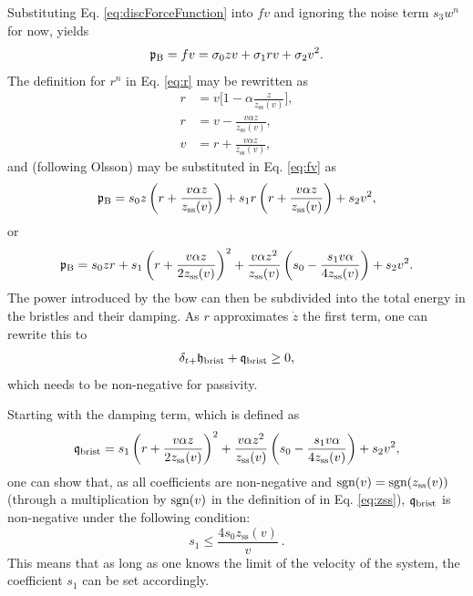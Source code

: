 Substituting Eq. \eqref{eq:discForceFunction} into $fv$ and ignoring the noise term $s_3w^n$ for now, yields
\begin{equation}\label{eq:fv}
    \mathfrak{p}_{\text{B}} = fv = \sigma_{0}zv +\sigma_{1}rv+\sigma_{2}v^2.
\end{equation}
The definition for $r^n$ in Eq. \eqref{eq:r} may be rewritten as
\begin{equation*}
    \begin{aligned}
        r &= v\bigg[1-\alpha\frac{z}{z_\text{ss}(v)}\bigg],\\
        r &= v-\frac{v\alpha z}{z_\text{ss}(v)},\\
        v &= r + \frac{v\alpha z}{z_\text{ss}(v)},
    \end{aligned}
\end{equation*}
and (following Olsson) may be substituted in Eq. \eqref{eq:fv} as
\begin{equation}
    \mathfrak{p}_{\text{B}} = s_{0}z\left(r+ \frac{v\alpha z}{z_\text{ss}(v)}\right)+s_{1}r\left(r+ \frac{v\alpha z}{z_\text{ss}(v)}\right)+s_{2}v^2,
\end{equation}
or
\begin{equation}
    \mathfrak{p}_{\text{B}} = s_0zr+s_1\left(r+\frac{v\alpha z}{2z_\text{ss}(v)}\right)^2+\frac{v\alpha z^2}{z_\text{ss}(v)}\left(s_0-\frac{s_1v\alpha}{4z_\text{ss}(v)}\right)+s_2v^2.
\end{equation}
The power introduced by the bow can then be subdivided into the total energy in the bristles and their damping. As $r$ approximates $\dot z$ the first term, one can rewrite this to 
\begin{equation*}
    \delta_{t+} \mathfrak{h}_\text{brist} + \mathfrak{q}_\text{brist} \geq 0,
\end{equation*}
which needs to be non-negative for passivity. 

Starting with the damping term, which is defined as
\begin{equation}
    \mathfrak{q}_\text{brist} = s_1\left(r+\frac{v\alpha z}{2z_\text{ss}(v)}\right)^2+\frac{v\alpha z^2}{z_\text{ss}(v)}\left(s_0-\frac{s_1v\alpha}{4z_\text{ss}(v)}\right)+s_2v^2,
\end{equation}
one can show that, as all coefficients are non-negative and $\text{sgn}(v) = \text{sgn}(z_\text{ss}(v))$ (through a multiplication by $\text{sgn}(v)$ in the definition of in Eq. \eqref{eq:zss}), $\mathfrak{q}_\text{brist}$ is non-negative under the following condition:
\begin{equation}
    s_1 \leq \frac{4s_0z_\text{ss}(v)}{v}\ .
\end{equation}
This means that as long as one knows the limit of the velocity of the system, the coefficient $s_1$ can be set accordingly.

